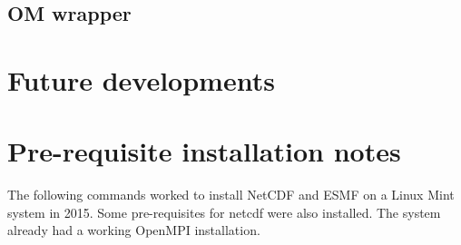 \documentclass[12pt]{article}
\begin{document}
\subsection{OM wrapper}

\section{Future developments}

\appendix

\section{Pre-requisite installation notes}
\label{app:A}
The following commands worked to install NetCDF and ESMF on a Linux Mint system in 2015.
Some pre-requisites for netcdf were also installed.
The system already had a working OpenMPI installation.
\end{document}
